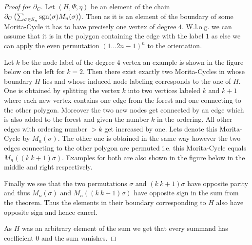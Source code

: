 \begin{proof}[Proof for $\partial_C$]
	Let $(H,\Psi,\eta)$ be an element of the chain $\partial_{C}\left(\sum_{\sigma \in S_{n}} \operatorname{sgn}(\sigma) M_{n}(\sigma)\right)$.
	Then as it is an element of the boundary of some Morita-Cycle it has to
	have precisely one vertex of degree $4$. W.l.o.g. we can assume that it is in the polygon containing the 
	edge with the label $1$ as else we can apply the even permutation $(1 \ldots 2n-1)^{n}$ to the orientation.

	Let $k$ be the node label of the degree $4$ vertex an example is shown in the figure below on the left for $k = 2$. 
	Then there exist exactly two Morita-Cycles in whose boundary $H$ lies and whose induced node labeling corresponds to the one of $H$.
	One is obtained by splitting the vertex $k$ into two vertices labeled $k$ and $k+1$ where each new vertex contains one edge from the forest and one connecting to the other polygon.
	Moreover the two new nodes get connected by an edge which is also added to the forest and given the number $k$ in the ordering.
	All other edges with ordering number  $> k $ get increased by one. Lets denote this Morita-Cycle by $M_{n}(\sigma)$.
	The other one is obtained in the same way however the two edges connecting to the other polygon are permuted i.e.
	this Morita-Cycle equals $M_{n}((k\ k+1)\sigma)$.
	Examples for both are also shown in the figure below in the middle and right respectively.

	Finally we see that the two permutations $\sigma$ and $(k\ k+1) \sigma$ have opposite parity and thus $M_{n}(\sigma)$ and $M_{n}((k\ k+1) \sigma)$ have
	opposite sign in the sum from the theorem. Thus the elements in their boundary corresponding to $H$ also have opposite sign and hence cancel.

	As $H$ was an arbitrary element of the sum we get that every summand has coefficient $0$ and the sum vanishes.
\end{proof}


